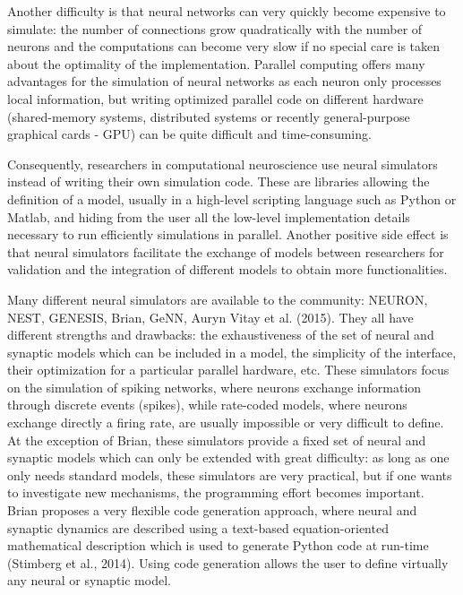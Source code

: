 \documentclass[
  11pt,
  a4paper,
]{scrbook}
\begin{document}
Another difficulty is that neural networks can very quickly become
expensive to simulate: the number of connections grow quadratically with
the number of neurons and the computations can become very slow if no
special care is taken about the optimality of the implementation.
Parallel computing offers many advantages for the simulation of neural
networks as each neuron only processes local information, but writing
optimized parallel code on different hardware (shared-memory systems,
distributed systems or recently general-purpose graphical cards - GPU)
can be quite difficult and time-consuming.

Consequently, researchers in computational neuroscience use neural
simulators instead of writing their own simulation code. These are
libraries allowing the definition of a model, usually in a high-level
scripting language such as Python or Matlab, and hiding from the user
all the low-level implementation details necessary to run efficiently
simulations in parallel. Another positive side effect is that neural
simulators facilitate the exchange of models between researchers for
validation and the integration of different models to obtain more
functionalities.

Many different neural simulators are available to the community: NEURON,
NEST, GENESIS, Brian, GeNN, Auryn Vitay et al. (2015). They all have
different strengths and drawbacks: the exhaustiveness of the set of
neural and synaptic models which can be included in a model, the
simplicity of the interface, their optimization for a particular
parallel hardware, etc. These simulators focus on the simulation of
spiking networks, where neurons exchange information through discrete
events (spikes), while rate-coded models, where neurons exchange
directly a firing rate, are usually impossible or very difficult to
define. At the exception of Brian, these simulators provide a fixed set
of neural and synaptic models which can only be extended with great
difficulty: as long as one only needs standard models, these simulators
are very practical, but if one wants to investigate new mechanisms, the
programming effort becomes important. Brian proposes a very flexible
code generation approach, where neural and synaptic dynamics are
described using a text-based equation-oriented mathematical description
which is used to generate Python code at run-time (Stimberg et al.,
2014). Using code generation allows the user to define virtually any
neural or synaptic model.
\end{document}
